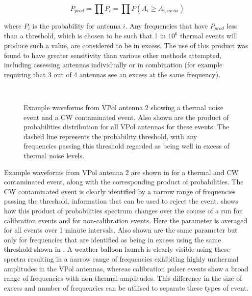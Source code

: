\begin{equation}
  P_{prod} = \prod P_{i} = \prod P(A_{i} \geq A_{i, meas})
  \label{eq:Analysis:CWRemoval:Prod-Prob}
\end{equation}

\noindent where $P_{i}$ is the probability for antenna $i$. Any frequencies that have $P_{prod}$ less than a threshold, which is chosen to be such that 1 in $10^{6}$ thermal events will produce such a value, are considered to be in excess. The use of this product was found to have greater sensitivity than various other methods attempted, including assessing antennas individually or in combination (for example requiring that 3 out of 4 antennas see an excess at the same frequency).


\begin{figure}[htpb]
  \hfill
  \\
  \hfill
  \caption{Example waveforms from VPol antenna 2 showing a thermal noise event and a CW contaminated event. Also shown are the product of probabilities distribution for all VPol antennas for these events. The dashed line represents the probability threshold, with any frequencies passing this threshold regarded as being well in excess of thermal noise levels.}
  \label{fig:analysis:CWRemoval:Baselines:Waveforms}
\end{figure}


Example waveforms from VPol antenna 2 are shown in  for a thermal and CW contaminated event, along with the corresponding product of probabilities. The CW contaminated event is clearly identified by a narrow range of frequencies passing the threshold, information that can be used to reject the event.  shows how this product of probabilities spectrum changes over the course of a run for calibration events and for non-calibration events. Here the parameter is averaged for all events over 1 minute intervals. Also shown are the same parameter but only for frequencies that are identified as being in excess using the same threshold shown in . A weather balloon launch is clearly visible using these spectra resulting in a narrow range of frequencies exhibiting highly unthermal amplitudes in the VPol antennas, whereas calibration pulser events show a broad range of frequencies with non-thermal amplitudes. This difference in the size of excess and number of frequencies can be utilised to separate these types of event.


